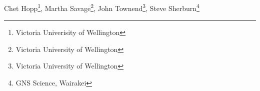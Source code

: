 Chet Hopp\footnote{Victoria Univerisity of Wellington}, Martha Savage\footnote{Victoria University of Wellington}, John Townend\footnote{Victoria University of Wellington}, Steve Sherburn\footnote{GNS Science, Wairakei}